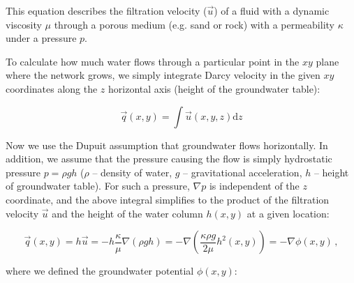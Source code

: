 \documentclass[]{pracamgr}
\begin{document}
      This equation describes the filtration velocity ($\vec{u}$) of a fluid with a dynamic viscosity $\mu$ through a porous medium (e.g. sand or rock) with a permeability $\kappa$ under a pressure $p$.
    
      To calculate how much water flows through a particular point in the $xy$ plane where the network grows, we simply integrate Darcy velocity in the given $xy$ coordinates along the $z$ horizontal axis (height of the groundwater table):
      
      \begin{equation}
        \vec{q}(x,y)=\int \vec{u}(x,y,z)\textrm{d}z
      \end{equation}
    
      Now we use the Dupuit \cite{dupuit1863etudes} assumption that groundwater flows horizontally. In addition, we assume that the pressure causing the flow is simply hydrostatic pressure $p = \rho g h $ ($\rho$ -- density of water, $g$ -- gravitational acceleration, $h$ -- height of groundwater table). For such a pressure, $\nabla p$ is independent of the $z$ coordinate, and the above integral simplifies to the product of the filtration velocity $\vec{u}$ and the height of the water column $h(x, y)$ at a given location:
      
      \begin{equation}
        \label{qq}
        \vec{q}(x,y)=h\vec{u}=-h \frac{\kappa}{\mu} \nabla(\rho g h)=-\nabla \left(\frac{\kappa \rho g}{2\mu}h^2(x,y)\right) = - \nabla \phi(x,y) \,,
      \end{equation}
      
      where we defined the groundwater potential $\phi(x,y)$:
      
\end{document}
